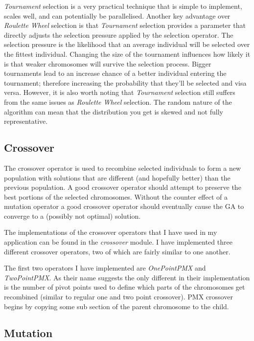 \documentclass[journal]{IEEEtran}
\begin{document}
\textit{Tournament} selection is a very practical technique that is simple to implement, scales well, and can potentially be parallelised. Another key advantage over \textit{Roulette Wheel} selection is that \textit{Tournament} selection provides a parameter that directly adjusts the selection pressure applied by the selection operator. The selection pressure is the likelihood that an average individual will be selected over the fittest individual. Changing the size of the tournament influences how likely it is that weaker chromosomes will survive the selection process. Bigger tournaments lead to an increase chance of a better individual entering the tournament; therefore increasing the probability that they'll be selected and visa versa. However, it is also worth noting that \textit{Tournament} selection still suffers from the same issues as \textit{Roulette Wheel} selection. The random nature of the algorithm can mean that the distribution you get is skewed and not fully representative.

\subsection{Crossover}
The crossover operator is used to recombine selected individuals to form a new population with solutions that are different (and hopefully better) than the previous population. A good crossover operator should attempt to preserve the best portions of the selected chromosomes. Without the counter effect of a mutation operator a good crossover operator should eventually cause the GA to converge to a (possibly not optimal) solution.

The implementations of the crossover operators that I have used in my application can be found in the \textit{crossover} module. I have implemented three different crossover operators, two of which are fairly similar to one another.

The first two operators I have implemented are \textit{OnePointPMX} and \textit{TwoPointPMX}. As their name suggests the only different in their implementation is the number of pivot points used to define which parts of the chromosomes get recombined (similar to regular one and two point crossover). PMX crossover begins by copying some sub section of the parent chromosome to the child.



\subsection{Mutation}
\end{document}
